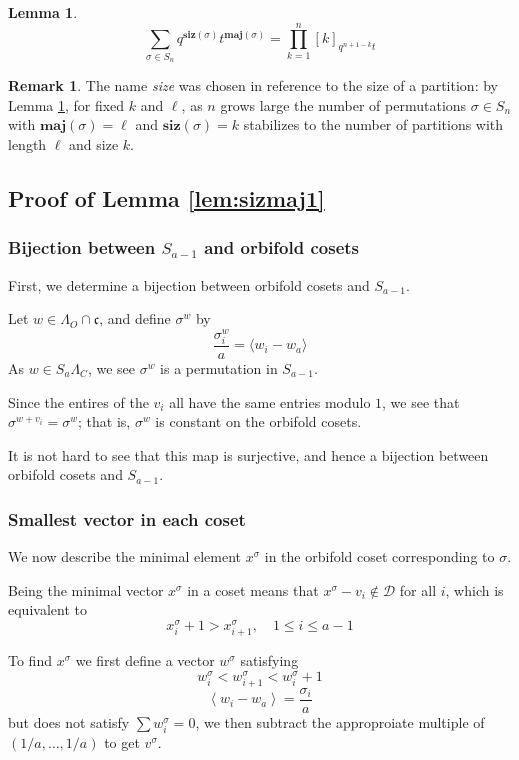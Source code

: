 \documentclass{amsart}[12pt]
\theoremstyle{definition}
\newtheorem{lemma}[dummy]{Lemma}
\newtheorem{remark}[dummy]{Remark}
\newcommand{\maj}{\mathbf{maj}}
\newcommand{\siz}{\mathbf{siz}}
\newcommand{\cone}{\mathfrak{c}}
\newcommand{\dominant}{\mathcal{D}}
\begin{document}
\begin{lemma} \label{lem:sizmaj2}
$$\sum_{\sigma\in S_n} q^{\siz(\sigma)} t^{\maj(\sigma)}=\prod_{k=1}^n [k]_{q^{n+1-k}t}$$
\end{lemma}


\begin{remark}
The name \emph{size} was chosen in reference to the size of a partition: by Lemma \ref{lem:sizmaj2}, for fixed $k$ and $\ell$, as $n$ grows large the number of permutations $\sigma\in S_n$ with $\maj(\sigma)=\ell$ and $\siz(\sigma)=k$ stabilizes to the number of partitions with length $\ell$ and size $k$.
\end{remark}


\subsection{Proof of Lemma \ref{lem:sizmaj1}}
\subsubsection{Bijection between $S_{a-1}$ and orbifold cosets}
First, we determine a bijection between orbifold cosets and $S_{a-1}$.  


Let $w\in\Lambda_O\cap \cone$, and define $\sigma^w$ by 
$$\frac{\sigma^w_i}{a}=\langle w_{i}-w_a\rangle$$
As $w\in S_a\Lambda_C$, we see $\sigma^w$ is a permutation in $S_{a-1}$.

Since the entires of the $v_i$ all have the same entries modulo $1$, we see that $\sigma^{w+v_i}=\sigma^w$; that is, $\sigma^w$ is constant on the orbifold cosets.  

It is not hard to see that this map is surjective, and hence a bijection between orbifold cosets and $S_{a-1}$.

\subsubsection{Smallest vector in each coset}
We now describe the minimal element $x^\sigma$ in the orbifold coset corresponding to $\sigma$.  

Being the minimal vector $x^\sigma$ in a coset means that $x^\sigma-v_i\notin\dominant$ for all $i$, which is equivalent to
$$x^\sigma_i+1>x^\sigma_{i+1},\quad 1\leq i\leq a-1$$

To find $x^\sigma$ we first define a vector $w^\sigma$ satisfying
$$w^\sigma_i<w^\sigma_{i+1}<w^\sigma_i+1$$
$$\left\langle w_i-w_a\right\rangle=\frac{\sigma_i}{a}$$
but does not satisfy $\sum w_i^\sigma=0$, we then subtract the approproiate multiple of $(1/a,\dots, 1/a)$ to get $v^\sigma$.
\end{document}
